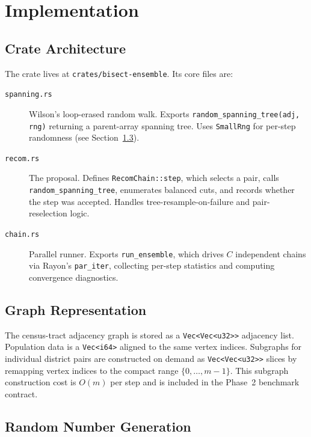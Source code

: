 \section{Implementation}
\label{sec:implementation}

\subsection{Crate Architecture}

The \re{} crate lives at \texttt{crates/bisect-ensemble}. Its core files are:

\begin{description}
  \item[\texttt{spanning.rs}] Wilson's loop-erased random walk.
    Exports \texttt{random\_spanning\_tree(adj, rng)} returning a parent-array
    spanning tree. Uses \texttt{SmallRng} for per-step randomness (see
    Section~\ref{ssec:rng}).

  \item[\texttt{recom.rs}] The \recom{} proposal.
    Defines \texttt{RecomChain::step}, which selects a pair, calls
    \texttt{random\_spanning\_tree}, enumerates balanced cuts, and records
    whether the step was accepted.
    Handles tree-resample-on-failure and pair-reselection logic.

  \item[\texttt{chain.rs}] Parallel runner.
    Exports \texttt{run\_ensemble}, which drives $C$ independent chains via
    Rayon's \texttt{par\_iter}, collecting per-step statistics and computing
    convergence diagnostics.
\end{description}

\subsection{Graph Representation}

The census-tract adjacency graph is stored as a \texttt{Vec<Vec<u32>>}
adjacency list. Population data is a \texttt{Vec<i64>} aligned to the same
vertex indices.
Subgraphs for individual district pairs are constructed on demand as
\texttt{Vec<Vec<u32>>} slices by remapping vertex indices to the
compact range $\{0,\ldots,m-1\}$.
This subgraph construction cost is $O(m)$ per step and is included in the
Phase~2 benchmark contract.

\subsection{Random Number Generation}
\label{ssec:rng}

